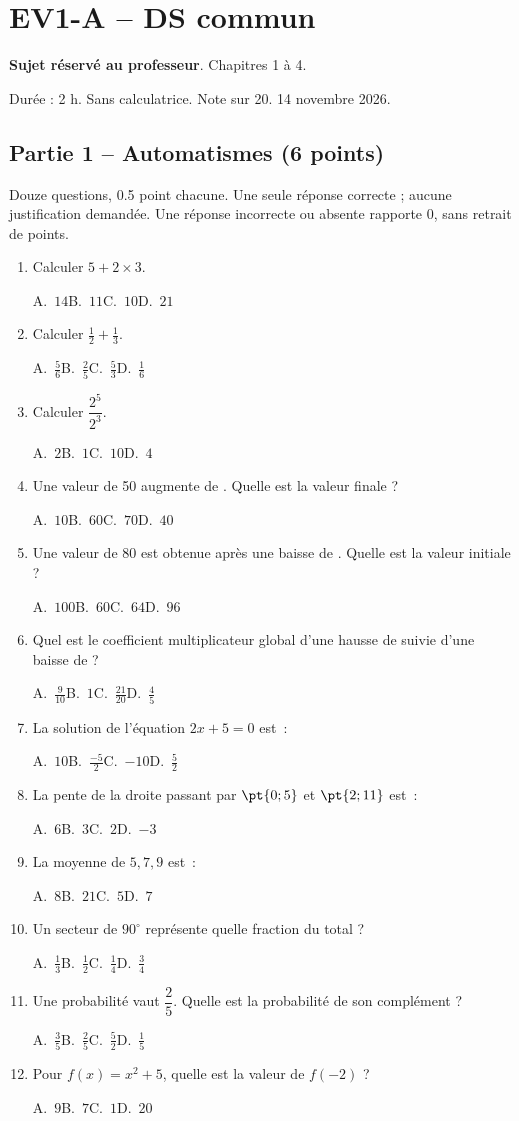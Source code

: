\mxnewpage\section*{EV1-A -- DS commun}\label{EV1-A}
\textbf{Sujet réservé au professeur}. Chapitres 1 à 4.\par Durée : 2 h. Sans calculatrice. Note sur 20. 14 novembre 2026.
\subsection*{Partie 1 -- Automatismes (6 points)}
Douze questions, \num{0,5} point chacune. Une seule réponse correcte ; aucune justification demandée. Une réponse incorrecte ou absente rapporte 0, sans retrait de points.
\begin{enumerate}
\item Calculer $5+2\times3$.\par A.~$14$\quad B.~$11$\quad C.~$10$\quad D.~$21$
\item Calculer $\frac12+\frac13$.\par A.~$\frac{5}{6}$\quad B.~$\frac{2}{5}$\quad C.~$\frac{5}{3}$\quad D.~$\frac{1}{6}$
\item Calculer $\dfrac{2^5}{2^{3}}$.\par A.~$2$\quad B.~$1$\quad C.~$10$\quad D.~$4$
\item Une valeur de 50 augmente de . Quelle est la valeur finale ?\par A.~$10$\quad B.~$60$\quad C.~$70$\quad D.~$40$
\item Une valeur de 80 est obtenue après une baisse de . Quelle est la valeur initiale ?\par A.~$100$\quad B.~$60$\quad C.~$64$\quad D.~$96$
\item Quel est le coefficient multiplicateur global d'une hausse de  suivie d'une baisse de  ?\par A.~$\frac{9}{10}$\quad B.~$1$\quad C.~$\frac{21}{20}$\quad D.~$\frac{4}{5}$
\item La solution de l'équation $2x+5=0$ est~:\par A.~$10$\quad B.~$\frac{-5}{2}$\quad C.~$-10$\quad D.~$\frac{5}{2}$
\item La pente de la droite passant par $\pt{0;5}$ et $\pt{2;11}$ est~:\par A.~$6$\quad B.~$3$\quad C.~$2$\quad D.~$-3$
\item La moyenne de $5, 7, 9$ est~:\par A.~$8$\quad B.~$21$\quad C.~$5$\quad D.~$7$
\item Un secteur de $90^\circ$ représente quelle fraction du total ?\par A.~$\frac{1}{3}$\quad B.~$\frac{1}{2}$\quad C.~$\frac{1}{4}$\quad D.~$\frac{3}{4}$
\item Une probabilité vaut $\dfrac{2}{5}$. Quelle est la probabilité de son complément ?\par A.~$\frac{3}{5}$\quad B.~$\frac{2}{5}$\quad C.~$\frac{5}{2}$\quad D.~$\frac{1}{5}$
\item Pour $f(x)=x^2+5$, quelle est la valeur de $f(-2)$ ?\par A.~$9$\quad B.~$7$\quad C.~$1$\quad D.~$20$
\end{enumerate}
